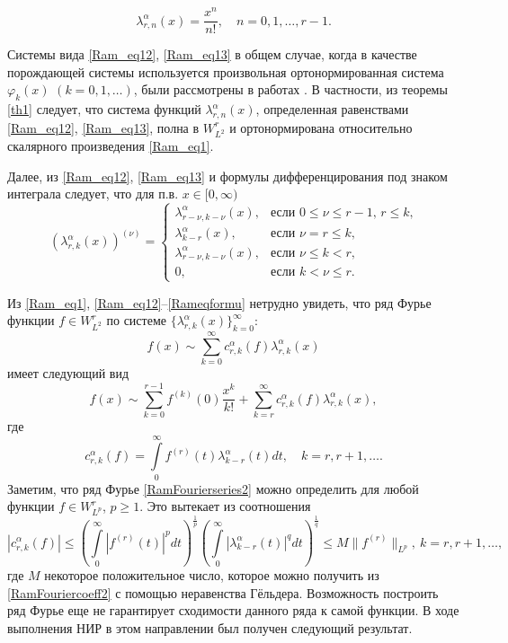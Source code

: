 \begin{equation}\label{Ram_eq13}
\lambda_{r,n}^{\alpha}(x) =\frac{x^n}{n!}, \quad n=0,1,\ldots, r-1.
\end{equation}

Системы вида \eqref{Ram_eq12}, \eqref{Ram_eq13} в общем случае, когда в качестве порождающей системы используется произвольная ортонормированная система $\varphi_k(x)$ $(k=0,1,\ldots)$, были рассмотрены в работах \cite{SharIzv2018, rep2017-ramis-Gadz16, Shar2017, rep2017-ramis-Gadz1, rep2017-ramis-shGadjGadjMir}.
В частности, из теоремы \ref{th1} \cite{SharIzv2018} следует, что система функций $\lambda_{r,n}^\alpha(x)$, определенная равенствами \eqref{Ram_eq12}, \eqref{Ram_eq13}, полна в $W^r_{L^2}$ и ортонормирована относительно скалярного произведения \eqref{Ram_eq1}.

Далее, из \eqref{Ram_eq12}, \eqref{Ram_eq13} и формулы дифференцирования под знаком интеграла \cite[п. 509, с. 667]{rep2017-sobcheb_urav-fiht2} следует, что для п.в. $x\in[0,\infty)$
\begin{equation}\label{Rameqformu}
(\lambda_{r,k}^\alpha(x))^{(\nu)} =
\begin{cases}
\lambda_{r-\nu,k-\nu}^\alpha(x),&\text{если $0\le\nu\le r-1$, $r\le k$,}\\
\lambda_{k-r}^\alpha(x),&\text{если $\nu=r\le k$,}\\
\lambda_{r-\nu,k-\nu}^\alpha(x),&\text{если $\nu\le k< r$,}\\
0,&\text{если $k< \nu\le r$}.
\end{cases}
\end{equation}

Из \eqref{Ram_eq1}, \eqref{Ram_eq12}--\eqref{Rameqformu} нетрудно увидеть, что ряд Фурье функции $f\in W^r_{L^2}$ по системе  $\{\lambda^\alpha_{r,k}(x)\}_{k=0}^\infty$:
\begin{equation*}
f(x)\sim \sum_{k=0}^{\infty}c_{r,k}^\alpha(f)\lambda_{r,k}^\alpha(x)
\end{equation*}
имеет следующий вид
\begin{equation}\label{RamFourierseries2}
f(x)\sim \sum_{k=0}^{r-1}f^{(k)}(0)\frac{x^k}{k!}+\sum_{k=r}^{\infty} c_{r,k}^\alpha(f)\lambda_{r,k}^\alpha(x),
\end{equation}
где
\begin{equation}\label{RamFouriercoeff2}
c_{r,k}^\alpha(f)=\int\limits_0^\infty f^{(r)}(t)\lambda_{k-r}^\alpha(t)dt, \quad k=r, r+1, \ldots.
\end{equation}
Заметим, что ряд Фурье \eqref{RamFourierseries2} можно определить для любой функции $f\in W^r_{L^p}$, $p\geq1$. Это вытекает из соотношения 
$$
|c_{r,k}^\alpha(f)|\leq \left(\int\limits_0^\infty|f^{(r)}(t)|^p dt\right)^{\frac{1}{p}}
\left(\int\limits_0^\infty|\lambda_{k-r}^\alpha(t)|^q dt\right)^{\frac{1}{q}}\leq M\|f^{(r)}\|_{L^p},\ k=r, r+1, \ldots,
$$
где $M$ некоторое положительное число, которое можно получить из \eqref{RamFouriercoeff2} с помощью неравенства Гёльдера. 
Возможность построить ряд Фурье еще не гарантирует сходимости данного ряда к самой функции. В ходе выполнения НИР в этом направлении был получен следующий результат.

